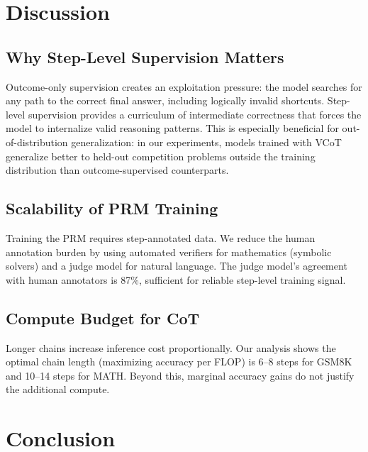\documentclass[11pt,a4paper]{article}
\begin{document}
\section{Discussion}
\label{sec:discussion}

\subsection{Why Step-Level Supervision Matters}

Outcome-only supervision creates an exploitation pressure: the model searches for any
path to the correct final answer, including logically invalid shortcuts. Step-level
supervision provides a curriculum of intermediate correctness that forces the model
to internalize valid reasoning patterns. This is especially beneficial for
out-of-distribution generalization: in our experiments, models trained with VCoT
generalize better to held-out competition problems outside the training distribution
than outcome-supervised counterparts.

\subsection{Scalability of PRM Training}

Training the PRM requires step-annotated data. We reduce the human annotation burden by
using automated verifiers for mathematics (symbolic solvers) and a judge model for
natural language. The judge model's agreement with human annotators is 87\%, sufficient
for reliable step-level training signal.

\subsection{Compute Budget for CoT}

Longer chains increase inference cost proportionally. Our analysis shows the optimal
chain length (maximizing accuracy per FLOP) is 6--8 steps for GSM8K and 10--14 steps
for MATH. Beyond this, marginal accuracy gains do not justify the additional compute.

\section{Conclusion}
\label{sec:conclusion}
\end{document}
